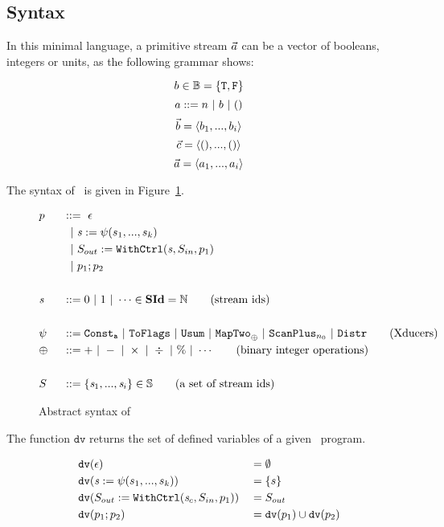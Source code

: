 \subsection{Syntax}
In this minimal language, a primitive stream $\vec a$ can be a vector of booleans, integers or units, as the following grammar shows:

$$b \in \mathbb{B} = \{\mathtt{T},\mathtt{F} \}$$
$$ a ::= n \ | \ b \ | \ ()$$
$$\vec b = \langle b_1,...,b_i \rangle$$ 
$$\vec c = \langle (),...,() \rangle $$
$$\vec a = \langle a_1,...,a_i \rangle  $$ 

\hspace{1cm}

The syntax of \fmsvcode \  is given in Figure~\ref{fig-svcode-grammar}.


\begin{figure}[H] \large
	\begin{alignat*}{2}
	&p  && :: = \ \epsilon \\ 
	&   &&\ \ | \ \mathit{s} := \psi(s_1,...,s_k) \\
	&   &&\ \ | \ S_{out} := \mathtt{WithCtrl}(\mathit{s},S_{in},p_1) \\
	&   &&\ \ | \ p_1;p_2  \\
	\\
	&\mathit{s} && ::= 0 \ | \ 1 \ | \ \cdots \in \mathbf{SId}  = \mathbb{N}   \tag{stream ids}\\
	\\
	& \psi \ && ::= \mathtt{Const_{a}} \ | \ \mathtt{ToFlags}  
	\ | \ \mathtt{Usum} \ | \ \mathtt{MapTwo}_{\oplus} \ | \ \mathtt{ScanPlus}_{n_0} \ | \ \mathtt{Distr}  \tag{Xducers} \\
	& \oplus \ && :: = + \ | \ - \ | \ \times \ | \ \div \ | \ \% \ | \ \cdots  \tag{binary integer operations}\\
	\\
	&  S && ::= \{\mathit{s}_1,..., \mathit{s}_i\} \in \mathbb{S}  \tag{a set of stream ids}
	\end{alignat*}
	\caption{Abstract syntax of \fmsvcode \  \label{fig-svcode-grammar}}
\end{figure}


The function $\texttt{dv}$ returns the set of defined variables of a given \fmsvcode \  program.

\begin{alignat*}{2}
&\mathtt{dv}(\epsilon) && =  \emptyset \\
&\mathtt{dv}(\mathit{s} := \psi(s_1,...,s_k)) && =  \{s\} \\
&\mathtt{dv}(S_{out} := \mathtt{WithCtrl}(\mathit{s}_c,S_{in},p_1)) && =   S_{out} \\
&\mathtt{dv}(p_1;p_2) && =  \mathtt{dv}(p_1) \cup \mathtt{dv}(p_2) \\
\end{alignat*}

